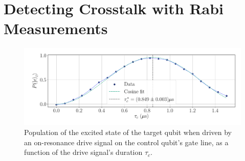 \section{Detecting Crosstalk with Rabi Measurements}

\begin{figure}[t!]
    \centering
    \includegraphics[width = 0.8 \textwidth]{Images/Chap2.0/sigma.pdf}
    \vspace{-0.4cm}
    \caption{Population of the excited state of the target qubit when driven by an on-resonance drive signal on the control qubit's gate line, as a function of the drive signal's duration $\tau_c$.}
    \label{fig:sigmas}
\end{figure}


